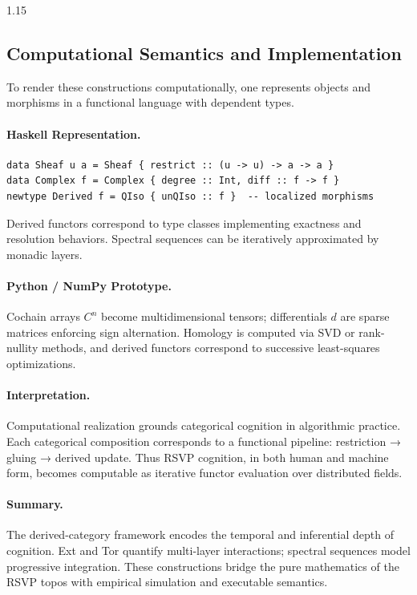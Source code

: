 \documentclass[12pt,a4paper]{article}
\begin{document}
\begin{spacing}{1.15}
\subsection{Computational Semantics and Implementation}

To render these constructions computationally,
one represents objects and morphisms in a functional language with dependent types.

\paragraph{Haskell Representation.}
\begin{verbatim}
data Sheaf u a = Sheaf { restrict :: (u -> u) -> a -> a }
data Complex f = Complex { degree :: Int, diff :: f -> f }
newtype Derived f = QIso { unQIso :: f }  -- localized morphisms
\end{verbatim}
Derived functors correspond to type classes implementing exactness
and resolution behaviors.
Spectral sequences can be iteratively approximated by monadic layers.

\paragraph{Python / NumPy Prototype.}
Cochain arrays \(C^n\) become multidimensional tensors;
differentials \(d\) are sparse matrices enforcing sign alternation.
Homology is computed via SVD or rank-nullity methods,
and derived functors correspond to successive least-squares optimizations.

\paragraph{Interpretation.}
Computational realization grounds categorical cognition in algorithmic practice.
Each categorical composition corresponds to a functional pipeline:
restriction → gluing → derived update.
Thus RSVP cognition, in both human and machine form,
becomes computable as iterative functor evaluation over distributed fields.

\paragraph{Summary.}
The derived-category framework encodes the temporal and inferential depth of cognition.
Ext and Tor quantify multi-layer interactions;
spectral sequences model progressive integration.
These constructions bridge the pure mathematics of the RSVP topos
with empirical simulation and executable semantics.


\end{spacing}
\end{document}
